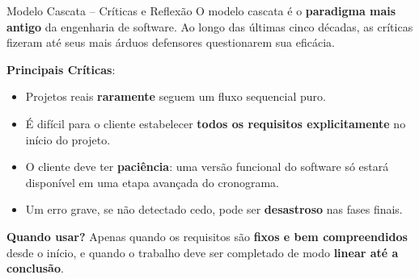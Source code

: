 \documentclass[9pt]{beamer}
\begin{document}
\begin{frame}{Modelo Cascata -- Críticas e Reflexão}
  O modelo cascata é o \textbf{paradigma mais antigo} da engenharia de software. Ao longo das últimas cinco décadas, as críticas fizeram até seus mais árduos defensores questionarem sua eficácia.

  \vspace{0.3cm}
  \textbf{Principais Críticas}:
  \begin{itemize}
    \item Projetos reais \textbf{raramente} seguem um fluxo sequencial puro.
    \item É difícil para o cliente estabelecer \textbf{todos os requisitos explicitamente} no início do projeto.
    \item O cliente deve ter \textbf{paciência}: uma versão funcional do software só estará disponível em uma etapa avançada do cronograma.
    \item Um erro grave, se não detectado cedo, pode ser \textbf{desastroso} nas fases finais.
  \end{itemize}

  \vspace{0.3cm}
  \centering
  \colorbox{yellow!15}{
    \parbox{0.88\textwidth}{
      \scriptsize
      \textbf{Quando usar?} Apenas quando os requisitos são \textbf{fixos e bem compreendidos} desde o início, e quando o trabalho deve ser completado de modo \textbf{linear até a conclusão}.
    }
  }
\end{frame}

\end{document}
